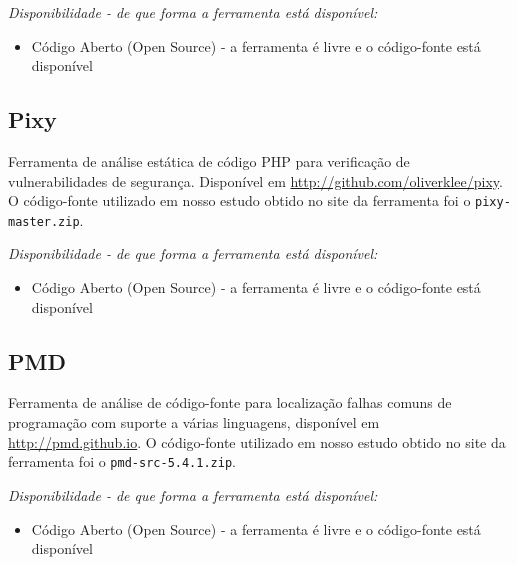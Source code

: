 \begin{description}

  \item {\it Disponibilidade - de que forma a ferramenta está disponível:}
    \begin{itemize}
      \item Código Aberto (Open Source) - a ferramenta é livre e o código-fonte está disponível
    \end{itemize}

\end{description}

\subsection{Pixy}

Ferramenta de análise estática de código PHP para verificação de
vulnerabilidades de segurança. Disponível em
\url{http://github.com/oliverklee/pixy}. O código-fonte utilizado em nosso
estudo obtido no site da ferramenta foi o \texttt{pixy-master.zip}.

\begin{description}

  \item {\it Disponibilidade - de que forma a ferramenta está disponível:}
    \begin{itemize}
      \item Código Aberto (Open Source) - a ferramenta é livre e o código-fonte está disponível
    \end{itemize}

\end{description}

\subsection{PMD}

Ferramenta de análise de código-fonte para localização falhas comuns de
programação com suporte a várias linguagens, disponível em
\url{http://pmd.github.io}.  O código-fonte utilizado em nosso estudo obtido
no site da ferramenta foi o \texttt{pmd-src-5.4.1.zip}.

\begin{description}

  \item {\it Disponibilidade - de que forma a ferramenta está disponível:}
    \begin{itemize}
      \item Código Aberto (Open Source) - a ferramenta é livre e o código-fonte está disponível
    \end{itemize}

\end{description}

